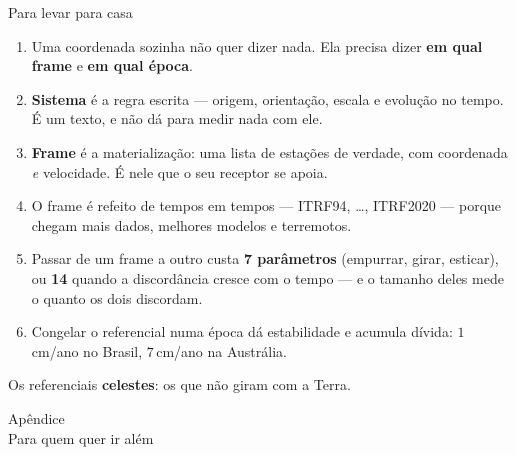 \documentclass[aspectratio=169,11pt]{beamer}
\newcommand{\bnum}[1]{\textbf{\textcolor{mTeal}{#1}}}
\newcommand{\sist}[1]{\textcolor{corSist}{\textbf{#1}}}
\newcommand{\fram}[1]{\textcolor{corFrame}{\textbf{#1}}}
\begin{document}
\begin{frame}{Para levar para casa}
  \footnotesize
  \begin{enumerate}
    \setlength{\itemsep}{3.5pt}
    \item Uma coordenada sozinha não quer dizer nada. Ela precisa dizer \bnum{em qual frame}
          e \bnum{em qual época}.
    \item \sist{Sistema} é a regra escrita --- origem, orientação, escala e evolução no
          tempo. É um texto, e \alert{não dá para medir nada com ele}.
    \item \fram{Frame} é a materialização: uma lista de estações de verdade, com coordenada
          \emph{e} velocidade. É nele que o seu receptor se apoia.
    \item O frame é refeito de tempos em tempos --- ITRF94, \ldots, ITRF2020 --- porque
          chegam mais dados, melhores modelos e terremotos.
    \item Passar de um frame a outro custa \bnum{7 parâmetros} (empurrar, girar, esticar),
          ou \bnum{14} quando a discordância cresce com o tempo --- e o tamanho deles mede
          o quanto os dois discordam.
    \item Congelar o referencial numa época dá estabilidade e acumula dívida:
          $1$\,cm/ano no Brasil, $7$\,cm/ano na Austrália.
  \end{enumerate}
  \smallskip
  \begin{ideia}[title={Na Parte 2}]
    \small Os referenciais \textbf{celestes}: os que não giram com a Terra.
  \end{ideia}
\end{frame}

\appendix

\begin{frame}[standout]
  Apêndice\\[6pt]
  {\normalsize Para quem quer ir além}
\end{frame}
\end{document}
